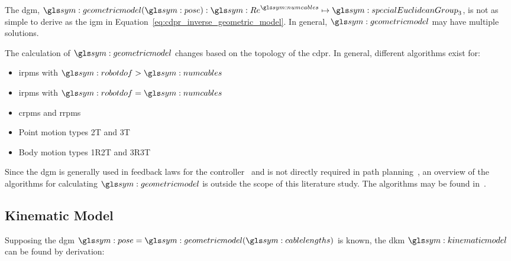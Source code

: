             The \gls{dgm},
            \(
                \geometricmodel(\pose):\Re^{\numcables}\mapsto\specialEuclideanGroup{3}
            \),
			is	 not   as	simple	 to   derive	as	  the	 \gls{igm}	  in
            Equation~\ref{eq:cdpr_inverse_geometric_model}. In general,
            $\geometricmodel$ may have multiple solutions.

			The calculation of $\geometricmodel$ changes based on  the	topology
			of the \gls{cdpr}.	In	general,  different  algorithms  exist	for:

            \begin{itemize}

                \item[]

                    \glspl{irpm} with $\robotdof > \numcables$

                \item[]

                    \glspl{irpm} with $\robotdof = \numcables$

                \item[]

                    \glspl{crpm} and \glspl{rrpm}

                \item[]

                    Point motion types 2T and 3T

                \item[]

                    Body motion types 1R2T and 3R3T

            \end{itemize}

			Since the \gls{dgm} is generally used in feedback laws for the
			controller~\cite[][page
			121]{bib:cdpr:cable_driven_parallel_robots_theory_and_application}
			and is not directly required in path
			planning~\cite{bib:planning:planning_algorithms}, an overview of the
			algorithms for calculating $\geometricmodel$ is outside the scope of
			this literature study. The algorithms may be found in~\cite[][page
			137]{bib:cdpr:cable_driven_parallel_robots_theory_and_application}.

    \subsection{Kinematic Model}%
    \label{sec:kinematic_model}

		Supposing the  \gls{dgm}  $\pose  =  \geometricmodel(\cablelengths)$  is
		known,	 the   \gls{dkm}   $\kinematicmodel$	can    be	 found	  by
        derivation:

